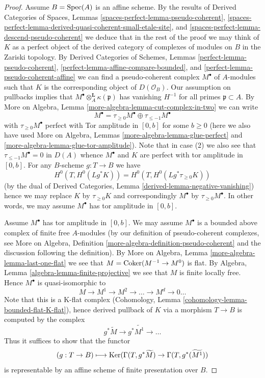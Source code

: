 \begin{proof}
\medskip\noindent
Assume $B = \mathop{\mathrm{Spec}}(A)$ is an affine scheme. By the results of
Derived Categories of Spaces, Lemmas
\ref{spaces-perfect-lemma-pseudo-coherent},
\ref{spaces-perfect-lemma-derived-quasi-coherent-small-etale-site}, and
\ref{spaces-perfect-lemma-descend-pseudo-coherent}
we deduce that in the rest of the proof we may think of $K$ as a perfect
object of the derived category of complexes of modules on $B$
in the Zariski topology. By 
Derived Categories of Schemes, Lemmas
\ref{perfect-lemma-pseudo-coherent},
\ref{perfect-lemma-affine-compare-bounded}, and
\ref{perfect-lemma-pseudo-coherent-affine} we can find a pseudo-coherent
complex $M^\bullet$ of $A$-modules such that $K$ is the corresponding
object of $D(\mathcal{O}_B)$. Our assumption on pullbacks implies
that $M^\bullet \otimes^\mathbf{L}_A \kappa(\mathfrak p)$
has vanishing $H^{-1}$ for all primes $\mathfrak p \subset A$.
By More on Algebra, Lemma \ref{more-algebra-lemma-cut-complex-in-two}
we can write
$$
M^\bullet =
\tau_{\geq 0}M^\bullet \oplus \tau_{\leq - 1}M^\bullet
$$
with $\tau_{\geq 0}M^\bullet$ perfect with Tor amplitude in $[0, b]$
for some $b \geq 0$ (here we also have used
More on Algebra, Lemmas \ref{more-algebra-lemma-glue-perfect} and
\ref{more-algebra-lemma-glue-tor-amplitude}).
Note that in case (2) we also see that $\tau_{\leq - 1}M^\bullet = 0$
in $D(A)$ whence $M^\bullet$ and $K$ are perfect with
tor amplitude in $[0, b]$. For any $B$-scheme $g : T \to B$ we have
$$
H^0(T, H^0(Lg^*K)) = H^0(T, H^0(Lg^*\tau_{\geq 0}K))
$$
(by the dual of Derived Categories, Lemma
\ref{derived-lemma-negative-vanishing})
hence we may replace $K$ by $\tau_{\geq 0}K$ and correspondingly
$M^\bullet$ by $\tau_{\geq 0}M^\bullet$. In other words, we may
assume $M^\bullet$ has tor amplitude in $[0, b]$.

\medskip\noindent
Assume $M^\bullet$ has tor amplitude in $[0, b]$.
We may assume $M^\bullet$ is a bounded above complex of finite free
$A$-modules (by our definition of pseudo-coherent complexes, see
More on Algebra, Definition \ref{more-algebra-definition-pseudo-coherent}
and the discussion following the definition).
By More on Algebra, Lemma \ref{more-algebra-lemma-last-one-flat}
we see that $M = \mathop{\mathrm{Coker}}(M^{- 1} \to M^0)$ is flat. By
Algebra, Lemma \ref{algebra-lemma-finite-projective} we see that $M$
is finite locally free. Hence $M^\bullet$ is quasi-isomorphic to
$$
M \to M^1 \to M^2 \to \ldots \to M^d \to 0 \ldots
$$
Note that this is a K-flat complex
(Cohomology, Lemma \ref{cohomology-lemma-bounded-flat-K-flat}),
hence derived pullback of $K$ via a morphism $T \to B$ is computed
by the complex
$$
g^*\widetilde{M} \to g^*\widetilde{M^1} \to \ldots
$$
Thus it suffices to show that the functor
$$
(g : T \to B) \longmapsto
\mathop{\mathrm{Ker}}(
\Gamma(T,g^*\widetilde{M})
\to
\Gamma(T, g^*(\widetilde{M^1})
)
$$
is representable by an affine scheme of finite presentation over $B$.


\end{proof}
